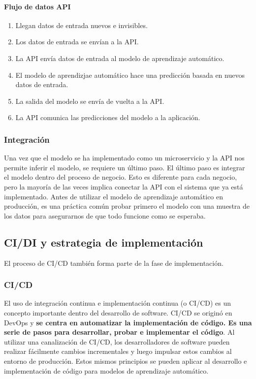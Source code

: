 \documentclass[10pt]{book}
\begin{document}
\paragraph{Flujo de datos API}
\begin{enumerate}
    \item Llegan datos de entrada nuevos e invisibles.
    \item Los datos de entrada se envían a la API.
    \item La API envía datos de entrada al modelo de aprendizaje automático.
    \item El modelo de aprendizjae automático hace una predicción basada en nuevos datos de entrada.
    \item La salida del modelo se envía de vuelta a la API.
    \item La API comunica las predicciones del modelo a la aplicación.
\end{enumerate}

\subsubsection{Integración}
Una vez que el modelo se ha implementado como un microservicio y la API nos permite inferir el modelo, se requiere un último paso. El último paso es integrar el modelo dentro del proceso de negocio. Esto es diferente para cada negocio, pero la mayoría de las veces implica conectar la API con el sistema que ya está implementado. Antes de utilizar el modelo de aprendizaje automático en producción, es una práctica común probar primero el modelo con una muestra de los datos para asegurarnos de que todo funcione como se esperaba.


\subsection{CI/DI y estrategia de implementación}
El proceso de CI/CD también forma parte de la fase de implementación.

\subsubsection{CI/CD}
El uso de integración continua e implementación continua (o CI/CD) es un concepto importante dentro del desarrollo de software. CI/CD se originó en DevOps y \textbf{se centra en automatizar la implementación de código. Es una serie de pasos para desarrollar, probar e implementar el código}. Al utilizar una canalización de CI/CD, los desarrolladores de software pueden realizar fácilmente cambios incrementales y luego impulsar estos cambios al entorno de producción. Estos mismos principios se pueden aplicar al desarrollo e implementación de código para modelos de aprendizaje automático.
\end{document}
